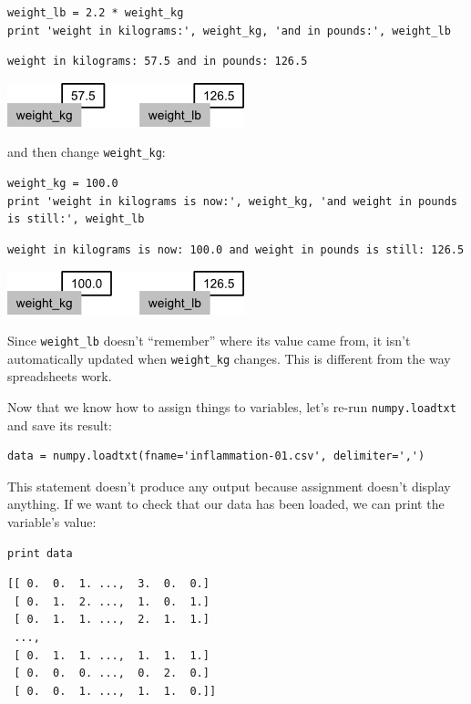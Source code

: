 \documentclass{book}
\begin{document}
\begin{verbatim}
weight_lb = 2.2 * weight_kg
print 'weight in kilograms:', weight_kg, 'and in pounds:', weight_lb
\end{verbatim}

\begin{verbatim}
weight in kilograms: 57.5 and in pounds: 126.5
\end{verbatim}

\includegraphics{novice/python/img/python-sticky-note-variables-02.png}

and then change \texttt{weight\_kg}:

\begin{verbatim}
weight_kg = 100.0
print 'weight in kilograms is now:', weight_kg, 'and weight in pounds is still:', weight_lb
\end{verbatim}

\begin{verbatim}
weight in kilograms is now: 100.0 and weight in pounds is still: 126.5
\end{verbatim}

\includegraphics{novice/python/img/python-sticky-note-variables-03.png}

Since \texttt{weight\_lb} doesn't ``remember'' where its value came
from, it isn't automatically updated when \texttt{weight\_kg} changes.
This is different from the way spreadsheets work.

Now that we know how to assign things to variables, let's re-run
\texttt{numpy.loadtxt} and save its result:

\begin{verbatim}
data = numpy.loadtxt(fname='inflammation-01.csv', delimiter=',')
\end{verbatim}

This statement doesn't produce any output because assignment doesn't
display anything. If we want to check that our data has been loaded, we
can print the variable's value:

\begin{verbatim}
print data
\end{verbatim}

\begin{verbatim}
[[ 0.  0.  1. ...,  3.  0.  0.]
 [ 0.  1.  2. ...,  1.  0.  1.]
 [ 0.  1.  1. ...,  2.  1.  1.]
 ...,
 [ 0.  1.  1. ...,  1.  1.  1.]
 [ 0.  0.  0. ...,  0.  2.  0.]
 [ 0.  0.  1. ...,  1.  1.  0.]]
\end{verbatim}
\end{document}
